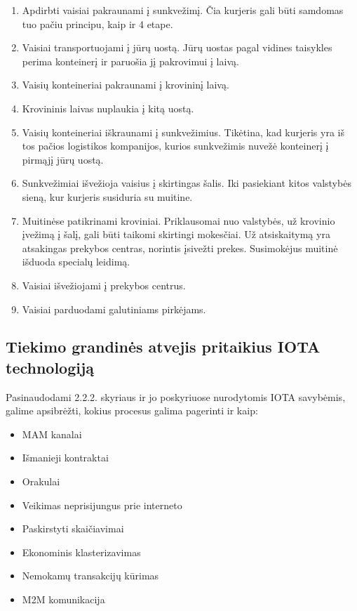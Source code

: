 \begin{enumerate}
    \item Apdirbti vaisiai pakraunami į sunkvežimį. Čia kurjeris gali būti samdomas tuo pačiu principu, kaip ir 4 etape.
    \item Vaisiai transportuojami į jūrų uostą. Jūrų uostas pagal vidines taisykles perima konteinerį ir paruošia jį pakrovimui į laivą.
    \item Vaisių konteineriai pakraunami į krovininį laivą.
    \item Krovininis laivas nuplaukia į kitą uostą.
    \item Vaisių konteineriai iškraunami į sunkvežimius. Tikėtina, kad kurjeris yra iš tos pačios logistikos kompanijos, kurios sunkvežimis nuvežė konteinerį į pirmąjį jūrų uostą.
    \item Sunkvežimiai išvežioja vaisius į skirtingas šalis. Iki pasiekiant kitos valstybės sieną, kur kurjeris susiduria su muitine.
    \item Muitinėse patikrinami kroviniai. Priklausomai nuo valstybės, už krovinio įvežimą į šalį, gali būti taikomi skirtingi mokesčiai. Už atsiskaitymą yra atsakingas prekybos centras, norintis įsivežti prekes. Susimokėjus muitinė išduoda specialų leidimą.
    \item Vaisiai išvežiojami į prekybos centrus.
    \item Vaisiai parduodami galutiniams pirkėjams.
\end{enumerate}




\subsection{Tiekimo grandinės atvejis pritaikius IOTA technologiją}

Pasinaudodami 2.2.2. skyriaus ir jo poskyriuose nurodytomis IOTA savybėmis, galime apsibrėžti, kokius procesus galima pagerinti ir kaip:
\begin{itemize}
    \item MAM kanalai
    \item Išmanieji kontraktai
    \item Orakulai
    \item Veikimas neprisijungus prie interneto
    \item Paskirstyti skaičiavimai
    \item Ekonominis klasterizavimas
    \item Nemokamų transakcijų kūrimas
    \item M2M komunikacija
\end{itemize}